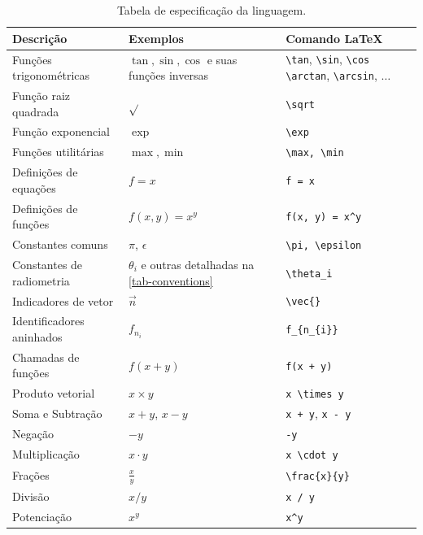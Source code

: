 \begin{table}[htbp]
\centering
\begin{tabular}{|l|l|l|}
\hline
    \textbf{Descrição} & \textbf{Exemplos} & \textbf{Comando \LaTeX{}} \\ \hline

    \small Funções trigonométricas & $\tan, \sin, \cos$ {\small e suas funções inversas}
    &\small\verb"\tan", \verb"\sin", \verb"\cos"
    \newline\verb"\arctan", \verb"\arcsin", $\dots$
    \\ \hline
\small Função raiz quadrada & $\sqrt{}$ & \verb|\sqrt| \\ \hline
\small Função exponencial & $\exp{}$ & \verb|\exp| \\ \hline
\small Funções utilitárias & $\max, \min$ & \verb|\max, \min| \\ \hline
\small Definições de equações & $f = x$ & \verb|f = x| \\ \hline
\small Definições de funções & $f(x, y) = x^y$ & \verb|f(x, y) = x^y| \\ \hline
\small Constantes comuns & $\pi$, $\epsilon$ & \verb|\pi, \epsilon| \\ \hline
\small Constantes de radiometria & $\theta_i$ {\small e outras detalhadas na \autoref{tab-conventions}} & \verb|\theta_i| \\ \hline
\small Indicadores de vetor & $\vec{n}$ & \verb|\vec{}| \\ \hline
\small Identificadores aninhados & $f_{n_{i}}$ & \verb|f_{n_{i}}| \\ \hline
\small Chamadas de funções & $f(x + y)$ & \verb|f(x + y)| \\ \hline
\small Produto vetorial & $x \times y$ & \verb|x \times y| \\ \hline
\small Soma e Subtração & $x + y$, $x - y$ & \verb|x + y|, \verb|x - y| \\ \hline
\small Negação & $-y$ & \verb|-y| \\ \hline
\small Multiplicação & $x \cdot y$ & \verb|x \cdot y| \\ \hline
\small Frações & $\frac{x}{y}$ & \verb|\frac{x}{y}| \\ \hline
\small Divisão & $x / y$ & \verb|x / y| \\ \hline
\small Potenciação & $x^y$ & \verb|x^y| \\ \hline
\end{tabular}
\caption{Tabela de especificação da linguagem.}
\label{tab-definition-of-lang}
\end{table}

